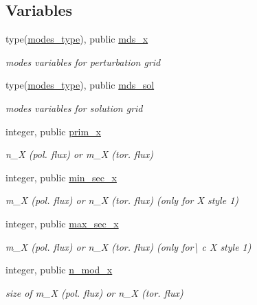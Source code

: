 \subsection*{Variables}
\begin{DoxyCompactItemize}
\item 
type(\hyperlink{structx__vars_1_1modes__type}{modes\+\_\+type}), public \hyperlink{namespacex__vars_a690d4228d2a81ec5a7a6cd13be3a56a1}{mds\+\_\+x}
\begin{DoxyCompactList}\small\item\em modes variables for perturbation grid \end{DoxyCompactList}\item 
type(\hyperlink{structx__vars_1_1modes__type}{modes\+\_\+type}), public \hyperlink{namespacex__vars_ac74f59668de6caca7038decc7191c6a1}{mds\+\_\+sol}
\begin{DoxyCompactList}\small\item\em modes variables for solution grid \end{DoxyCompactList}\item 
integer, public \hyperlink{namespacex__vars_ae7f7061534fb3ad68a538cdcea20d1d9}{prim\+\_\+x}
\begin{DoxyCompactList}\small\item\em {\ttfamily n\+\_\+X} (pol. flux) or {\ttfamily m\+\_\+X} (tor. flux) \end{DoxyCompactList}\item 
integer, public \hyperlink{namespacex__vars_a0d63825aabc4c71623c6ea7ffe033949}{min\+\_\+sec\+\_\+x}
\begin{DoxyCompactList}\small\item\em {\ttfamily m\+\_\+X} (pol. flux) or {\ttfamily n\+\_\+X} (tor. flux) (only for {\ttfamily X} style 1) \end{DoxyCompactList}\item 
integer, public \hyperlink{namespacex__vars_ae19ca528c5688228ff20912a45290b2a}{max\+\_\+sec\+\_\+x}
\begin{DoxyCompactList}\small\item\em {\ttfamily m\+\_\+X} (pol. flux) or {\ttfamily n\+\_\+X} (tor. flux) (only for\textbackslash{} c X style 1) \end{DoxyCompactList}\item 
integer, public \hyperlink{namespacex__vars_a2e8fe6c5fe1cf61704bf176925d2b02e}{n\+\_\+mod\+\_\+x}
\begin{DoxyCompactList}\small\item\em size of {\ttfamily m\+\_\+X} (pol. flux) or {\ttfamily n\+\_\+X} (tor. flux) \end{DoxyCompactList}\item 

\end{DoxyCompactItemize}
